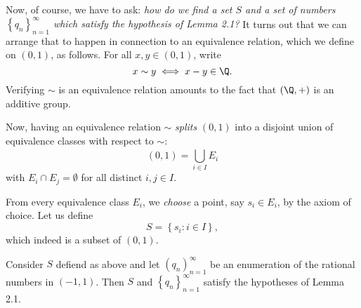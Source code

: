 \documentclass[pmath450]{subfiles}
\begin{document}
    \np Now, of course, we have to ask: \textit{how do we find a set $S$ and a set of numbers $\left\lbrace q_n \right\rbrace^{\infty}_{n=1}$ which satisfy the hypothesis of Lemma 2.1?} It turns out that we can arrange that to happen in connection to an equivalence relation, which we define on $\left( 0,1 \right)$, as follows. For all $x,y\in\left( 0,1 \right)$, write
    \begin{equation*}
        x\sim y \iff x-y\in\Q.
    \end{equation*}
    Verifying $\sim$ is an equivalence relation amounts to the fact that $\left( \Q,+ \right)$ is an additive group.

    Now, having an equivalence relation $\sim$ \textit{splits} $\left( 0,1 \right)$ into a disjoint union of equivalence classes with respect to $\sim$:
    \begin{equation*}
        \left( 0,1 \right) = \bigcup^{}_{i\in I}E_i
    \end{equation*}
    with $E_i\cap E_j=\emptyset$ for all distinct $i,j\in I$. 

    From every equivalence class $E_i$, we \textit{choose} a point, say $s_i\in E_i$, by the axiom of choice. Let us define
    \begin{equation*}
        S = \left\lbrace s_i: i\in I \right\rbrace,
    \end{equation*}
    which indeed is a subset of $\left( 0,1 \right)$.

    \begin{prop}{}
        Consider $S$ defiend as above and let $\left( q_{n} \right)^{\infty}_{n=1}$ be an enumeration of the rational numbers in $\left( -1,1 \right)$. Then $S$ and $\left\lbrace q_n \right\rbrace^{\infty}_{n=1}$ satisfy the hypotheses of Lemma 2.1. 
    \end{prop}
\end{document}
